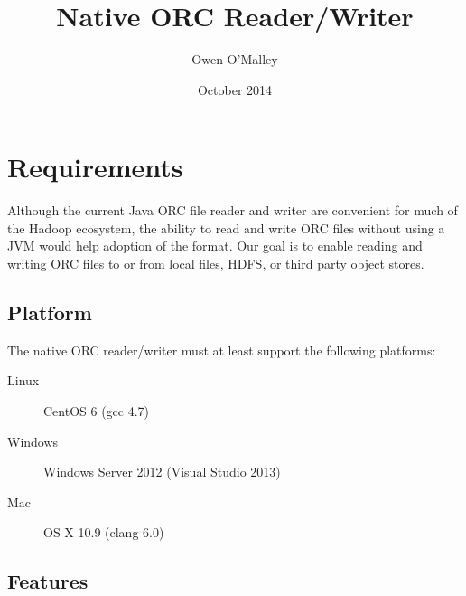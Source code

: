 \documentclass{article}
\title{Native ORC Reader/Writer}
\author{Owen O'Malley}
\date{October 2014}
\begin{document}
\maketitle

\section{Requirements}

Although the current Java ORC file reader and writer are convenient
for much of the Hadoop ecosystem, the ability to read and write ORC
files without using a JVM would help adoption of the format. Our goal
is to enable reading and writing ORC files to or from local files,
HDFS, or third party object stores.

\subsection{Platform}

The native ORC reader/writer must at least support the following platforms:

\begin{description}
\item [Linux] CentOS 6 (gcc 4.7)
\item [Windows] Windows Server 2012 (Visual Studio 2013)
\item [Mac] OS X 10.9 (clang 6.0)
\end{description}

\subsection{Features}
\end{document}
